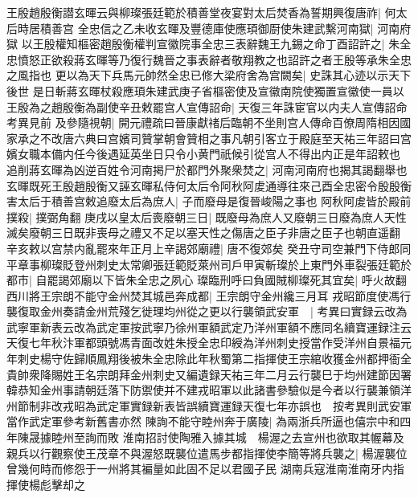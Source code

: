 王殷趙殷衡譛玄暉云與柳璨張廷範於積善堂夜宴對太后焚香為誓期興復唐祚|{
	何太后時居積善宫}
全忠信之乙未收玄暉及豐德庫使應頊御㕑使朱建武繫河南獄|{
	河南府獄}
以王殷權知樞密趙殷衡權判宣徽院事全忠三表辭魏王九錫之命丁酉詔許之|{
	朱全忠憤怒正欲殺蔣玄暉等乃復行魏晉之事表辭者敬翔教之也詔許之者王殷等承朱全忠之風指也}
更以為天下兵馬元帥然全忠已修大梁府舍為宫闕矣|{
	史誅其心迹以示天下後世}
是日斬蔣玄暉杖殺應頊朱建武庚子省樞密使及宣徽南院使獨置宣徽使一員以王殷為之趙殷衡為副使辛丑敕罷宫人宣傳詔命|{
	天復三年誅宦官以内夫人宣傳詔命考異見前}
及參隨視朝|{
	開元禮疏曰晉康獻禇后臨朝不坐則宫人傳命百僚周隋相因國家承之不改唐六典曰宫嬪司贊掌朝會贊相之事凡朝引客立于殿庭至天祐三年詔曰宫嬪女職本備内任今後遇延英坐日只令小黄門祇候引從宫人不得出内正是年詔敕也}
追削蔣玄暉為凶逆百姓令河南掲尸於都門外聚衆焚之|{
	河南河南府也揭其謁翻舉也}
玄暉既死王殷趙殷衡又誣玄暉私侍何太后令阿秋阿䖍通導往來己酉全忠密令殷殷衡害太后于積善宫敕追廢太后為庶人|{
	子而廢母是復晉峻陽之事也}
阿秋阿䖍皆於殿前撲殺|{
	撲弼角翻}
庚戌以皇太后喪廢朝三日|{
	既廢母為庶人又廢朝三日廢為庶人天性滅矣廢朝三日既非喪母之禮又不足以塞天性之傷唐之臣子非唐之臣子也朝直遥翻}
辛亥敕以宫禁内亂罷來年正月上辛謁郊廟禮|{
	唐不復郊矣}
癸丑守司空兼門下侍郎同平章事柳璨貶登州刺史太常卿張廷範貶萊州司戶甲寅斬璨於上東門外車裂張廷範於都市|{
	自罷謁郊廟以下皆朱全忠之夙心}
璨臨刑呼曰負國賊柳璨死其宜矣|{
	呼火故翻}
西川將王宗朗不能守金州焚其城邑奔成都|{
	王宗朗守金州纔三月耳}
戎昭節度使馮行襲復取金州奏請金州荒殘乞徙理均州從之更以行襲領武安軍　|{
	考異曰實録云改為武寧軍新表云改為武定軍按武寧乃徐州軍額武定乃洋州軍額不應同名續寶運録注云天復七年秋汴軍都頭號馮青面改姓朱授全忠印綬為洋州刺史授當作受洋州自景福元年刺史楊守佐歸順鳳翔後被朱全忠除此年秋蜀第二指揮使王宗綰收獲金州都押衙全貴帥衆降賜姓王名宗朗拜金州刺史又編遺録天祐三年二月云行襲巳于均州建節因署韓恭知金州事請朝廷落下防禦使并不建戎昭軍以此諸書參驗似是今者以行襲兼領洋州節制非改戎昭為武定軍實録新表皆誤續寶運録天復七年亦誤也　按考異則武安軍當作武定軍參考新舊書亦然}
陳詢不能守睦州奔于廣陵|{
	為兩浙兵所逼也僖宗中和四年陳晟據睦州至詢而敗}
淮南招討使陶雅入據其城　楊渥之去宣州也欲取其幄幕及親兵以行觀察使王茂章不與渥怒既襲位遣馬步都指揮使李簡等將兵襲之|{
	楊渥襲位曾幾何時而修怨于一州將其褊量如此固不足以君國子民}
湖南兵寇淮南淮南牙内指揮使楊彪擊却之

